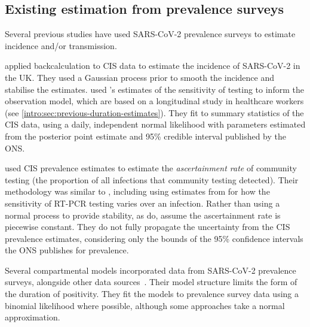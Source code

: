 \documentclass[thesis.tex]{subfiles}
\begin{document}
\subsection{Existing estimation from prevalence surveys}

Several previous studies have used SARS-CoV-2 prevalence surveys to estimate incidence and/or transmission.

\Textcite{abbottCISincidence} applied backcalculation to CIS data to estimate the incidence of SARS-CoV-2 in the UK.
They used a Gaussian process prior to smooth the incidence and stabilise the estimates.
\Textcite{abbottCISincidence} used \textcite{hellewellPCRSensitivity}'s estimates of the sensitivity of testing to inform the observation model, which are based on a longitudinal study in healthcare workers (see \cref{intro:sec:previous-duration-estimates}).
They fit to summary statistics of the CIS data, using a daily, independent normal likelihood with parameters estimated from the posterior point estimate and 95\% credible interval published by the ONS.

\Textcite{colmanAscertainment} used CIS prevalence estimates to estimate the \emph{ascertainment rate} of community testing (the proportion of all infections that community testing detected).
Their methodology was similar to \textcite{abbottCISincidence}, including using estimates from \textcite{hellewellPCRSensitivity} for how the sensitivity of RT-PCR testing varies over an infection.
Rather than using a normal process to provide stability, as \textcite{abbottCISincidence} do, \textcite{colmanAscertainment} assume the ascertainment rate is piecewise constant.
They do not fully propagate the uncertainty from the CIS prevalence estimates, considering only the bounds of the 95\% confidence intervals the ONS publishes for prevalence.

Several compartmental models incorporated data from SARS-CoV-2 prevalence surveys, alongside other data sources~\autocite{daviesAssociation,ironsEstimating,knockKey,nicholsonImproving,pooleyEstimation,birrellRTM2}.
Their model structure limits the form of the duration of positivity. 
They fit the models to prevalence survey data using a binomial likelihood where possible, although some approaches take a normal approximation.
\end{document}
